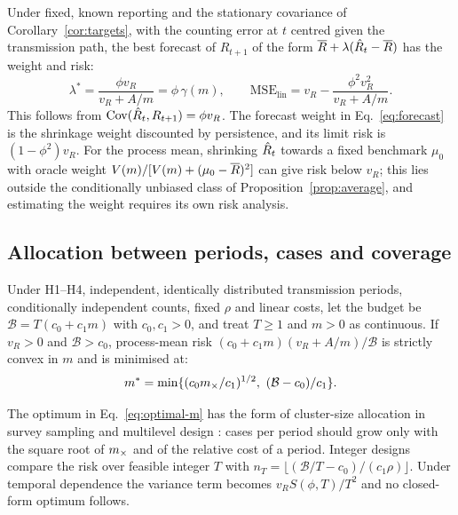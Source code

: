 Under fixed, known reporting and the stationary covariance of Corollary~\ref{cor:targets}, with the counting error at $t$ centred given the transmission path, the best forecast of $R_{t+1}$ of the form $\overline{R}+\lambda(\hat R_t-\overline{R})$ has the weight and risk:
\begin{equation}
 \lambda^*=\frac{\phi v_R}{v_R+A/m}=\phi\,\gamma(m),\qquad
 \mathrm{MSE}_{\mathrm{lin}}=v_R-\frac{\phi^2v_R^2}{v_R+A/m}.
 \label{eq:forecast}
\end{equation}
This follows from $\operatorname{Cov}(\hat R_t,R_{t+1})=\phi v_R$. The forecast weight in Eq.~\eqref{eq:forecast} is the shrinkage weight discounted by persistence, and its limit risk is $(1-\phi^2)v_R$. For the process mean, shrinking $\hat R_t$ towards a fixed benchmark $\mu_0$ with oracle weight $V(m)/[V(m)+(\mu_0-\overline{R})^2]$ can give risk below $v_R$; this lies outside the conditionally unbiased class of Proposition~\ref{prop:average}, and estimating the weight requires its own risk analysis.

\subsection{Allocation between periods, cases and coverage}
\label{app:allocation}

\begin{proposition}
\label{prop:allocation}
Under H1--H4, independent, identically distributed transmission periods, conditionally independent counts, fixed $\rho$ and linear costs, let the budget be $\mathcal B=T(c_0+c_1m)$ with $c_0,c_1>0$, and treat $T\ge1$ and $m>0$ as continuous. If $v_R>0$ and $\mathcal B>c_0$, process-mean risk $(c_0+c_1m)(v_R+A/m)/\mathcal B$ is strictly convex in $m$ and is minimised at:
\begin{equation}
 m^*=\min\{(c_0m_\times/c_1)^{1/2},\ (\mathcal B-c_0)/c_1\}.
 \label{eq:optimal-m}
\end{equation}
\end{proposition}

The optimum in Eq.~\eqref{eq:optimal-m} has the form of cluster-size allocation in survey sampling and multilevel design \citep{cochran1977sampling, raudenbush1997statistical}: cases per period should grow only with the square root of $m_\times$ and of the relative cost of a period. Integer designs compare the risk over feasible integer $T$ with $n_T=\lfloor(\mathcal B/T-c_0)/(c_1\rho)\rfloor$. Under temporal dependence the variance term becomes $v_RS(\phi,T)/T^2$ and no closed-form optimum follows.

